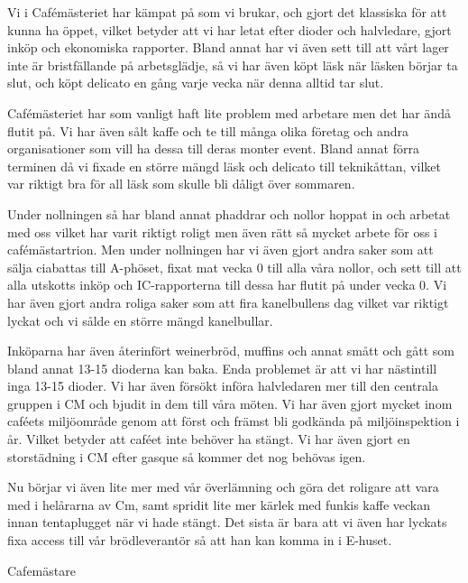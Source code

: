 \documentclass[../_main/handlingar.tex]{subfiles}
\begin{document}
\vspace{8px}

Vi i Cafémästeriet har kämpat på som vi brukar, och gjort det klassiska för att kunna ha öppet, vilket betyder att vi har letat efter dioder och halvledare, gjort inköp och ekonomiska rapporter. Bland annat har vi även sett till att vårt lager inte är bristfällande på arbetsglädje, så vi har även köpt läsk när läsken börjar ta slut, och köpt delicato en gång varje vecka när denna alltid tar slut. 

Cafémästeriet har som vanligt haft lite problem med arbetare men det har ändå flutit på. Vi har även sålt kaffe och te till många olika företag och andra organisationer som vill ha dessa till deras monter event. Bland annat förra terminen då vi fixade en större mängd läsk och delicato till teknikåttan, vilket var riktigt bra för all läsk som skulle bli dåligt över sommaren. 

Under nollningen så har bland annat phaddrar och nollor hoppat in och arbetat med oss vilket har varit riktigt roligt men även rätt så mycket arbete för oss i cafémästartrion. Men under nollningen har vi även gjort andra saker som att sälja ciabattas till A-phöset, fixat mat vecka 0 till alla våra nollor, och sett till att alla utskotts inköp och IC-rapporterna till dessa har flutit på under vecka 0. Vi har även gjort andra roliga saker som att fira kanelbullens dag vilket var riktigt lyckat och vi sålde en större mängd kanelbullar. 

Inköparna har även återinfört weinerbröd, muffins och annat smått och gått som bland annat 13-15 dioderna kan baka. Enda problemet är att vi har nästintill inga 13-15 dioder. Vi har även försökt införa halvledaren mer till den centrala gruppen i CM och bjudit in dem till våra möten. Vi har även gjort mycket inom caféets miljöområde genom att först och främst bli godkända på miljöinspektion i år. Vilket betyder att caféet inte behöver ha stängt. Vi har även gjort en storstädning i CM efter gasque så kommer det nog behövas igen. 

Nu börjar vi även lite mer med vår överlämning och göra det roligare att vara med i helårarna av Cm, samt spridit lite mer kärlek med funkis kaffe veckan innan tentaplugget när vi hade stängt. Det sista är bara att vi även har lyckats fixa access till vår brödleverantör så att han kan komma in i E-huset.

\begin{signatures}{1}
    \mvh
    \signature{\cafem}{Cafemästare}
\end{signatures}
\end{document}
